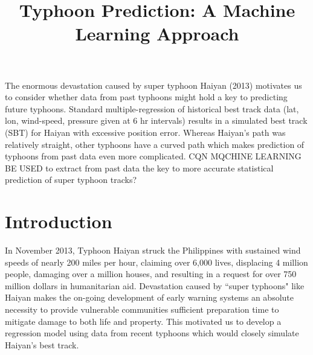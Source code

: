 \documentclass{SBCbookchapter}
\title{Typhoon Prediction: A Machine Learning Approach}
\begin{document}
\maketitle



\vspace{.3in}
\begin{minipage}[r]{4.25in}{\small
  The enormous devastation caused by super typhoon Haiyan (2013) motivates us to consider whether data from past typhoons might hold a key to predicting future typhoons.  Standard multiple-regression of historical
best track data (lat, lon, wind-speed, pressure given at 6 hr intervals) results in a simulated best track (SBT) for Haiyan with excessive position error. Whereas Haiyan's path was relatively straight, other typhoons have a curved path which makes prediction of typhoons from past data even more complicated.  CQN MQCHINE LEARNING BE USED to extract from past data the key to more accurate statistical prediction of super typhoon tracks?}
\end{minipage}

\newpage

\section{Introduction}

  In November 2013, Typhoon Haiyan struck the Philippines with sustained wind speeds of nearly 200
miles per hour, claiming over 6,000 lives, displacing 4 million people, damaging over a million houses,
and resulting in a request for over 750 million dollars
in humanitarian aid. Devastation caused by
``super typhoons" like Haiyan makes the on-going
development of early warning systems an absolute
necessity to provide vulnerable communities sufficient preparation time to
mitigate damage to both life and property. This motivated us to develop a regression model using data from recent typhoons which would closely simulate Haiyan's best track.
\end{document}
